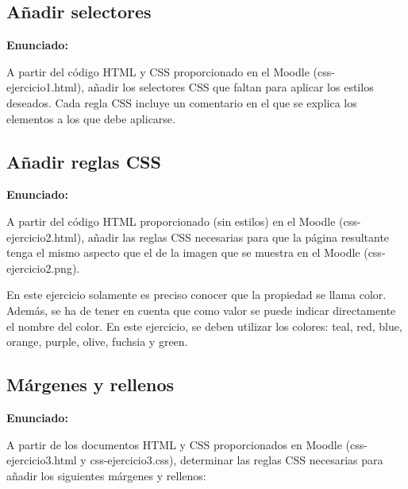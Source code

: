 \subsection{Añadir selectores}
\label{subsec:anadir-selectores}

\textbf{Enunciado:}

A partir del código HTML y CSS proporcionado en el Moodle (css-ejercicio1.html), añadir los selectores CSS que faltan para aplicar los estilos deseados. Cada regla CSS incluye un comentario en el que se explica los elementos a los que debe aplicarse.

\subsection{Añadir reglas CSS}
\label{subsec:anadir-reglas}

\textbf{Enunciado:}

A partir del código HTML proporcionado (sin estilos) en el Moodle (css-ejercicio2.html), añadir las reglas CSS necesarias para que la página resultante tenga el mismo aspecto que el de la imagen que se muestra en el Moodle (css-ejercicio2.png).

En este ejercicio solamente es preciso conocer que la propiedad se llama color. Además, se ha de tener en cuenta que como valor se puede indicar directamente el nombre del color. En este ejercicio, se deben utilizar los colores: teal, red, blue, orange, purple, olive, fuchsia y green.

\subsection{Márgenes y rellenos}
\label{subsec:margenes-rellenos}

\textbf{Enunciado:}

A partir de los documentos HTML y CSS proporcionados en Moodle (css-ejercicio3.html y css-ejercicio3.css), determinar las reglas CSS necesarias para añadir los siguientes márgenes y rellenos:

